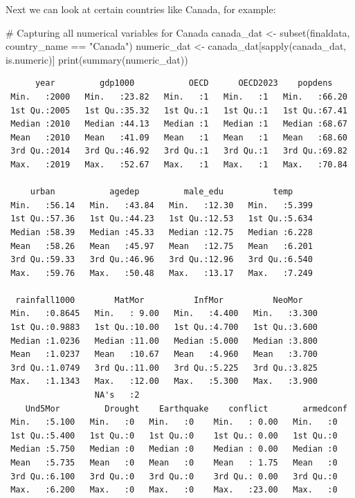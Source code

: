 \documentclass[
  11pt,
  letterpaper,
  DIV=11,
  numbers=noendperiod]{scrartcl}
\newenvironment{Shaded}{\begin{snugshade}}{\end{snugshade}}
\newcommand{\CommentTok}[1]{\textcolor[rgb]{0.37,0.37,0.37}{#1}}
\newcommand{\FunctionTok}[1]{\textcolor[rgb]{0.28,0.35,0.67}{#1}}
\newcommand{\NormalTok}[1]{\textcolor[rgb]{0.00,0.23,0.31}{#1}}
\newcommand{\OtherTok}[1]{\textcolor[rgb]{0.00,0.23,0.31}{#1}}
\newcommand{\SpecialCharTok}[1]{\textcolor[rgb]{0.37,0.37,0.37}{#1}}
\newcommand{\StringTok}[1]{\textcolor[rgb]{0.13,0.47,0.30}{#1}}
\begin{document}
Next we can look at certain countries like Canada, for example:

\begin{Shaded}
\begin{Highlighting}[]
\CommentTok{\# Capturing all numerical variables for Canada}
\NormalTok{canada\_dat }\OtherTok{\textless{}{-}} \FunctionTok{subset}\NormalTok{(finaldata, country\_name }\SpecialCharTok{==} \StringTok{"Canada"}\NormalTok{)}
\NormalTok{numeric\_dat }\OtherTok{\textless{}{-}}\NormalTok{ canada\_dat[}\FunctionTok{sapply}\NormalTok{(canada\_dat, is.numeric)]}
\FunctionTok{print}\NormalTok{(}\FunctionTok{summary}\NormalTok{(numeric\_dat))}
\end{Highlighting}
\end{Shaded}

\begin{verbatim}
      year         gdp1000           OECD      OECD2023    popdens     
 Min.   :2000   Min.   :23.82   Min.   :1   Min.   :1   Min.   :66.20  
 1st Qu.:2005   1st Qu.:35.32   1st Qu.:1   1st Qu.:1   1st Qu.:67.41  
 Median :2010   Median :44.13   Median :1   Median :1   Median :68.67  
 Mean   :2010   Mean   :41.09   Mean   :1   Mean   :1   Mean   :68.60  
 3rd Qu.:2014   3rd Qu.:46.92   3rd Qu.:1   3rd Qu.:1   3rd Qu.:69.82  
 Max.   :2019   Max.   :52.67   Max.   :1   Max.   :1   Max.   :70.84  
                                                                       
     urban           agedep         male_edu          temp      
 Min.   :56.14   Min.   :43.84   Min.   :12.30   Min.   :5.399  
 1st Qu.:57.36   1st Qu.:44.23   1st Qu.:12.53   1st Qu.:5.634  
 Median :58.39   Median :45.33   Median :12.75   Median :6.228  
 Mean   :58.26   Mean   :45.97   Mean   :12.75   Mean   :6.201  
 3rd Qu.:59.33   3rd Qu.:46.96   3rd Qu.:12.96   3rd Qu.:6.540  
 Max.   :59.76   Max.   :50.48   Max.   :13.17   Max.   :7.249  
                                                                
  rainfall1000        MatMor          InfMor          NeoMor     
 Min.   :0.8645   Min.   : 9.00   Min.   :4.400   Min.   :3.300  
 1st Qu.:0.9883   1st Qu.:10.00   1st Qu.:4.700   1st Qu.:3.600  
 Median :1.0236   Median :11.00   Median :5.000   Median :3.800  
 Mean   :1.0237   Mean   :10.67   Mean   :4.960   Mean   :3.700  
 3rd Qu.:1.0749   3rd Qu.:11.00   3rd Qu.:5.225   3rd Qu.:3.825  
 Max.   :1.1343   Max.   :12.00   Max.   :5.300   Max.   :3.900  
                  NA's   :2                                      
    Und5Mor         Drought    Earthquake    conflict       armedconf
 Min.   :5.100   Min.   :0   Min.   :0    Min.   : 0.00   Min.   :0  
 1st Qu.:5.400   1st Qu.:0   1st Qu.:0    1st Qu.: 0.00   1st Qu.:0  
 Median :5.750   Median :0   Median :0    Median : 0.00   Median :0  
 Mean   :5.735   Mean   :0   Mean   :0    Mean   : 1.75   Mean   :0  
 3rd Qu.:6.100   3rd Qu.:0   3rd Qu.:0    3rd Qu.: 0.00   3rd Qu.:0  
 Max.   :6.200   Max.   :0   Max.   :0    Max.   :23.00   Max.   :0  
                                                                     
\end{verbatim}
\end{document}
